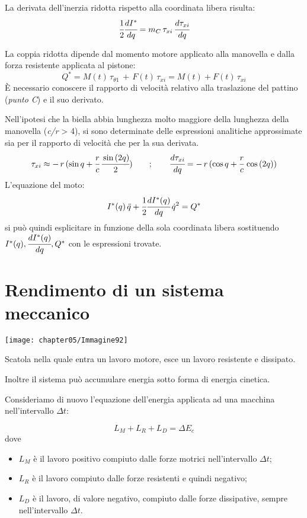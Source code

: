 	
	La derivata dell'inerzia ridotta rispetto alla coordinata libera risulta:
	\[
	\cfrac{1}{2}\cfrac{dI^*}{dq} = m_C\,\tau_{xi}\,\cfrac{d\tau_{xi}}{dq}
	\]
	
	La coppia ridotta dipende dal momento motore applicato alla manovella e dalla forza resistente applicata al pistone:
	\[
	Q^* = M(t)\,\tau_{\theta1}\,+\,F(t)\,\tau_{xi} = M(t) + F(t)\,\tau_{xi}
	\]
	È necessario conoscere il rapporto di velocità relativo alla traslazione del pattino (\emph{punto C}) e il suo derivato.
	
	Nell'ipotesi che la biella abbia lunghezza molto maggiore della lunghezza della manovella (\emph{c/r} > 4), si sono determinate delle espressioni analitiche approssimate sia per il rapporto di velocità che per la sua derivata.
	\begin{gather*}
	\tau_{xi}\approx -\,r\,(\sin{q} + \cfrac{r}{c}\,\cfrac{\sin{(2q)}}{2})\qquad;\qquad \cfrac{d\tau_{xi}}{dq} = -\,r\,(\cos{q}+\cfrac{r}{c}\,\cos{(2q)})
	\end{gather*}
	L'equazione del moto:
	\[
	I^*(q)\,\ddot{q} + \cfrac{1}{2}\cfrac{dI^*(q)}{dq}\,\dot{q}^2= Q^*	
	\]
	si può quindi esplicitare in funzione della sola coordinata libera sostituendo $I^*(q), \cfrac{dI^*(q)}{dq},Q^*$ con le espressioni trovate.
	
	\section{Rendimento di un sistema meccanico}
	
	\begin{minipage}{.3\textwidth}
	\centering
	\texttt{[image: chapter05/Immagine92]}
	\end{minipage}
	\hfill
	\begin{minipage}{.7\textwidth}
	Scatola nella quale entra un lavoro motore, esce un lavoro resistente e dissipato.
	
	 Inoltre il sistema può accumulare energia sotto forma di energia cinetica.

	Consideriamo di nuovo l'equazione dell'energia applicata ad una macchina nell'intervallo $\Delta t$:
	\end{minipage}
	
	\[L_M + L_R + L_D = \Delta E_c\]	
	dove
	\begin{itemize}
	\item $L_M$ è il lavoro positivo compiuto dalle forze motrici nell'intervallo $\Delta t$;
	\item $L_R$ è il lavoro compiuto dalle forze resistenti e quindi negativo;
	\item $L_D$ è il lavoro, di valore negativo, compiuto dalle forze dissipative, sempre nell'intervallo $\Delta t$.
	\end{itemize}
	
